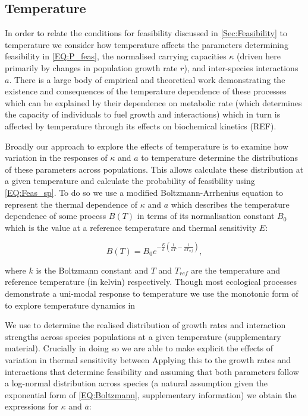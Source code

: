 \documentclass{article}
\begin{document}
\subsection{Temperature} \label{SEC:Temperature}
In order to relate the conditions for feasibility discussed in \cref{Sec:Feasibility} to temperature we consider how temperature affects the parameters determining feasibility in \cref{EQ:P_feas}, the normalised carrying capacities $\kappa$ (driven here primarily by changes in population growth rate $r$), and inter-species interactions $a$. There is a large body of empirical and theoretical work demonstrating the existence and consequences of the temperature dependence of these processes which can be explained by their dependence on metabolic rate (which determines the capacity of individuals to fuel growth and interactions) which in turn is affected by temperature through its effects on biochemical kinetics (REF). 

Broadly our approach to explore the effects of temperature is to examine how variation in the responses of $\kappa$ and $a$ to temperature determine the distributions of these parameters across populations. This allows calculate these distribution at a given temperature and calculate the probability of feasibility using \cref{EQ:Feas_sp}. To do so we use a modified Boltzmann-Arrhenius equation to represent the thermal dependence of $\kappa$ and $a$ which describes the temperature dependence of some process $B(T)$ in terms of its normalisation constant $B_0$ which is the value at a reference temperature and thermal sensitivity $E$:

\begin{equation} \label{EQ:Boltzmann}
    B(T) = B_0 e^{-\frac{E}{k} \left(\frac{1}{kT} - \frac{1}{k T_{ref} }\right)},
\end{equation}

where $k$ is the Boltzmann constant and $T$ and $T_{ref}$ are the temperature and reference temperature (in kelvin) respectively. Though most ecological processes demonstrate a uni-modal response to temperature we use the monotonic form of  to explore temperature dynamics in 
 
We use  to determine the realised distribution of growth rates and interaction strengths across species populations at a given temperature (supplementary material). Crucially in doing so we are able to make explicit the effects of variation in thermal sensitivity between  Applying this to the growth rates and interactions that determine feasibility and assuming that both parameters follow a log-normal distribution across species (a natural assumption given the exponential form of \cref{EQ:Boltzmann}, supplementary information) we obtain the expressions for $\kappa$ and $\bar{a}$:
\end{document}
